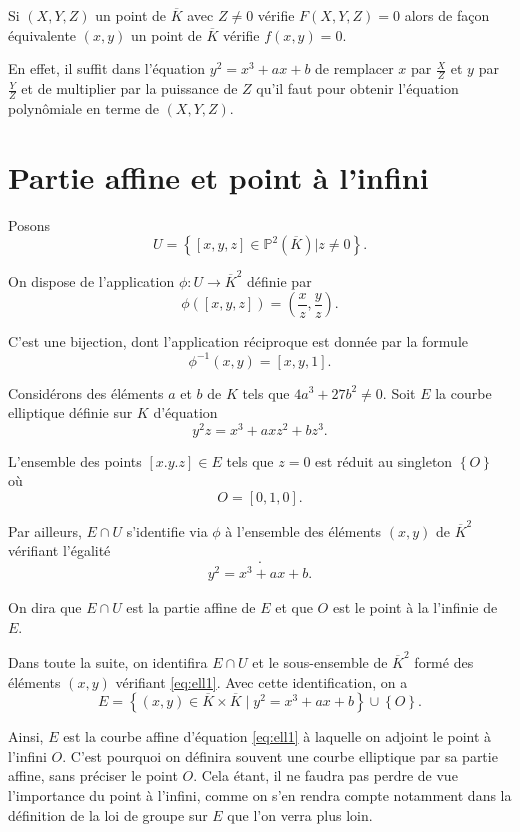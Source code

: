 \begin{remarque}
    Si $(X,Y,Z)$ un point de $\overline{K}$ avec $Z\neq 0$ vérifie $F(X,Y,Z)=0$ alors de façon équivalente $(x,y)$ un point de $\overline{K}$ vérifie $f(x,y)=0$.

    En effet, il suffit dans l'équation $y^2=x^3+ax+b$ de remplacer $x$ par $\frac{X}{Z}$ et $y$ par $\frac{Y}{Z}$ et de multiplier par la puissance de $Z$ qu'il faut pour obtenir l'équation polynômiale en terme de $(X,Y,Z)$.
\end{remarque}

\section{Partie affine et point à l'infini}

Posons 
\[
U = \left\{ [x,y,z] \in \mathbb{P}^2(\overline{K}) | z \neq 0 \right\} 
.\] 

On dispose de l'application $\phi : U \to \overline{K}^2$ définie par
\[
\phi([x,y,z])=\left( \frac{x}{z},\frac{y}{z} \right) 
.\] 

C'est une bijection, dont l'application réciproque est donnée par la formule
\[
\phi^{-1}(x,y)=\left[ x,y,1 \right] 
.\] 

Considérons des éléments $a$ et $b$ de $K$ tels que $4a^3+27b^2 \neq 0$. Soit $E$ la courbe elliptique définie sur $K$ d'équation 
\[
y^2z=x^3+axz^2+bz^3
.\] 

L'ensemble des points $[x.y.z] \in E$ tels que $z=0$ est réduit au singleton $\left\{ O \right\} $ où
\[
O = [0,1,0]
.\] 

Par ailleurs, $E \cap U$ s'identifie via $\phi$ à l'ensemble des éléments $(x,y)$ de $\overline{K}^2$ vérifiant l'égalité
\[
.\] 
\begin{align}
    \label{eq:ell1}
y^2 = x^3 + ax + b
.\end{align}

On dira que $E \cap U$ est la partie affine de $E$ et que $O$ est le point à la l'infinie de $E$.

Dans toute la suite, on identifira $E \cap U$ et le sous-ensemble de $\overline{K}^2$ formé des éléments $(x,y)$ vérifiant \eqref{eq:ell1}. Avec cette identification, on a 
\[
E = \left\{ (x,y) \in \overline{K} \times \overline{K} \mid y^2=x^3+ax+b \right\} \cup \left\{ O \right\} 
.\] 

Ainsi, $E$ est la courbe affine d'équation \eqref{eq:ell1} à laquelle on adjoint le point à l'infini $O$. C'est pourquoi on définira souvent une courbe elliptique par sa partie affine, sans préciser le point $O$. Cela étant, il ne faudra pas perdre de vue l'importance du point à l'infini, comme on s'en rendra compte notamment dans la définition de la loi de groupe sur $E$ que l'on verra plus loin.

